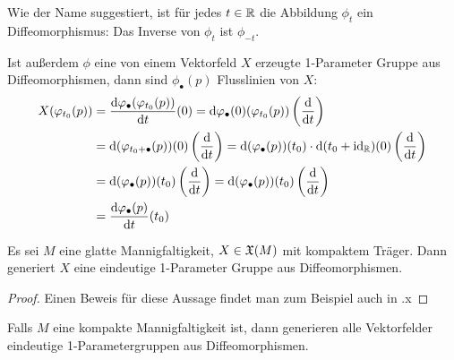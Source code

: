 \begin{remark}
    Wie der Name suggestiert, ist für jedes $t \in { \mathbb R }$ die Abbildung $\phi_t$ ein 
    Diffeomorphismus: Das Inverse von $\phi_t$ ist $\phi_{-t}$.

    Ist außerdem $\phi$ eine von einem Vektorfeld $X$ erzeugte 1-Parameter Gruppe aus 
    Diffeomorphismen, dann sind $\phi_{\bullet}(p)$ Flusslinien von $X$:
    \begin{align*}
        X(\varphi_{t_0}(p)) 
        & = \derive[\varphi_{\bullet}(\varphi_{t_0}(p))]{t}(0)
        = \opd \varphi_{\bullet} (0) (\varphi_{t_0}(p)) \left(\derive{t}\right) \\
        & = \opd (\varphi_{t_0 + \bullet}(p)) (0) \left(\derive{t}\right)
        = \opd (\varphi_{\bullet}(p)) (t_0) \cdot \opd (t_0 + \id_{\R}) (0) \left(\derive{t}\right) \\
        & = \opd (\varphi_{\bullet}(p)) (t_0) \left(\derive{t}\right)
        = \opd (\varphi_{\bullet}(p)) (t_0) \left(\derive{t}\right) \\
        & = \derive[\varphi_{\bullet}(p)]{t}(t_0)
    \end{align*}
\end{remark}

\begin{prop}
    \label{prop: kompaktes VF generiert 1-param. grp.}
    Es sei $M$ eine glatte Mannigfaltigkeit, $X \in { \mathfrak{X} } (M)$ mit kompaktem Träger. Dann 
    generiert $X$ eine eindeutige 1-Parameter Gruppe aus Diffeomorphismen.
\end{prop}

\begin{proof}
    Einen Beweis für diese Aussage findet man zum Beispiel auch in \cite{milnor}.x
\end{proof}

\begin{remark}
    Falls $M$ eine kompakte Mannigfaltigkeit ist, dann generieren alle Vektorfelder eindeutige 
    1-Parametergruppen aus Diffeomorphismen.
\end{remark}



